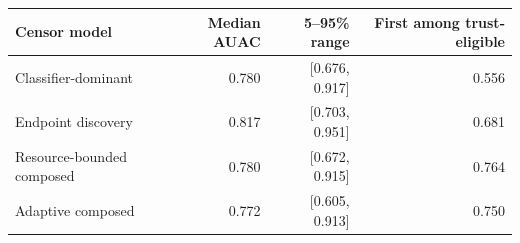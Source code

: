\begin{tabular}{lrrr}
\toprule
Censor model & Median AUAC & 5--95\% range & First among trust-eligible \\
\midrule
Classifier-dominant & 0.780 & [0.676, 0.917] & 0.556 \\
Endpoint discovery & 0.817 & [0.703, 0.951] & 0.681 \\
Resource-bounded composed & 0.780 & [0.672, 0.915] & 0.764 \\
Adaptive composed & 0.772 & [0.605, 0.913] & 0.750 \\
\bottomrule
\end{tabular}
